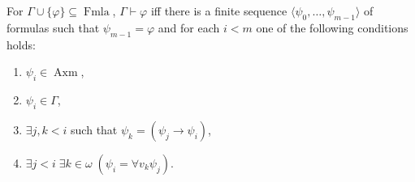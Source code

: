 For $\Gamma \cup \{\varphi\} \subseteq \operatorname{Fmla}$, $\Gamma \vdash \varphi$ iff there is a finite sequence $\langle \psi_0, \ldots, \psi_{m-1} \rangle$ of formulas such that $\psi_{m-1} = \varphi$ and for each $i < m$ one of the following conditions holds:
\begin{enumerate}
\item[(i)] $\psi_i \in \operatorname{Axm}$,
\item[(ii)] $\psi_i \in \Gamma$,
\item[(iii)] $\exists j, k < i$ such that $\psi_k = (\psi_j \to \psi_i)$,
\item[(iv)] $\exists j < i \; \exists k \in \omega \; (\psi_i = \forall v_k \psi_j)$.
\end{enumerate}
